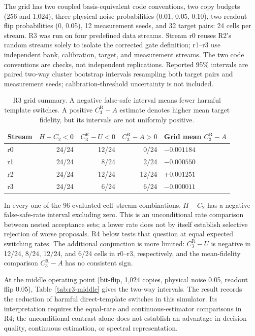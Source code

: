 \documentclass[11pt]{article}
\numberwithin{equation}{section}
\begin{document}
The grid has two coupled basis-equivalent code conventions, two copy budgets
(256 and 1,024), three physical-noise probabilities (0.01, 0.05, 0.10), two
readout-flip probabilities (0, 0.05), 12 measurement seeds, and 32 target pairs:
24 cells per stream.  R3 was run on four predefined data streams.  Stream r0
reuses R2's random streams solely to isolate the corrected gate definition;
r1--r3 use independent bank, calibration, target, and measurement streams.
The two code conventions are checks, not independent replications.  Reported
95\% intervals are paired two-way cluster bootstrap intervals resampling both
target pairs and measurement seeds; calibration-threshold uncertainty is not
included.

\begin{table}[ht]
\centering
\scriptsize
\setlength{\tabcolsep}{3pt}
\caption{R3 grid summary.  A negative false-safe interval means fewer harmful
template switches.  A positive $C_3^{\mathrm R}-A$ estimate denotes higher mean
target fidelity, but its intervals are not uniformly positive.}
\label{tab:r3-stream-summary}
\begin{tabular}{@{}lrrrl@{}}
\toprule
Stream & $H-C_2<0$ & $C_3^{\mathrm R}-U<0$ & $C_3^{\mathrm R}-A>0$ &
Grid mean $C_3^{\mathrm R}-A$ \\
\midrule
r0 & 24/24 & 12/24 & 0/24 & $-0.001184$ \\
r1 & 24/24 & 8/24 & 2/24 & $-0.000550$ \\
r2 & 24/24 & 12/24 & 12/24 & $+0.001251$ \\
r3 & 24/24 & 6/24 & 6/24 & $-0.000011$ \\
\bottomrule
\end{tabular}
\end{table}

In every one of the 96 evaluated cell--stream combinations, $H-C_2$ has a
negative false-safe-rate interval excluding zero.  This is an unconditional
rate comparison between nested acceptance sets; a lower rate does not by itself
establish selective rejection of worse proposals.  R4 below tests that question
at equal expected switching rates.  The additional conjunction is more limited:
$C_3^{\mathrm R}-U$
is negative in 12/24, 8/24, 12/24, and 6/24 cells in r0--r3, respectively, and
the mean-fidelity comparison $C_3^{\mathrm R}-A$ has no consistent sign.

At the middle operating point (bit-flip, 1,024 copies, physical noise 0.05,
readout flip 0.05), Table~\ref{tab:r3-middle} gives the two-way intervals.  The
result records the reduction of harmful direct-template switches in this
simulator.  Its interpretation requires the equal-rate and continuous-estimator
comparisons in R4; the unconditional contrast alone does not establish an
advantage in decision quality, continuous estimation, or spectral representation.
\end{document}
